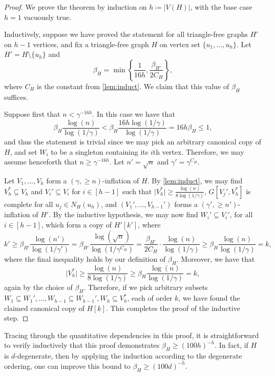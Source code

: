 \documentclass{aic}
\theoremstyle{plain}
\theoremstyle{remark}
\newcommand\ab[1]{\lvert #1 \rvert}
\begin{document}
\begin{proof}
    We prove the theorem by induction on $h\coloneqq\ab{V(H)}$, with the base case $h=1$ vacuously true.

    Inductively, suppose we have proved the statement for all triangle-free graphs $H'$ on $h-1$ vertices, and fix a triangle-free graph $H$ on vertex set $\{u_1,\dots,u_h\}$. Let $H' = H \setminus \{u_h\}$ and
    \[
    \beta_H = \min \left\{ \frac{1}{16h},  \frac{\beta_{H'}}{2C_H}\right\},
    \]
    where $C_H$ is the constant from \cref{lem:induct}.
    We claim that this value of $\beta_H$ suffices. 

    Suppose first that $n < \gamma^{-16h}$. In this case we have that
    \[
    \beta_H \frac{\log(n)}{\log(1/\gamma)} < \beta_H \frac{16h\log(1/\gamma)}{\log (1/\gamma)} =16h\beta_H \leq 1,
    \]
    and thus the statement is trivial since we may pick an arbitrary canonical copy of $H$, and set $W_i$ to be a singleton containing its $i$th vertex. Therefore, we may assume henceforth that $n \geq \gamma^{-16h}$. Let $n' = \sqrt n$ and $\gamma' = \gamma^{C_H}$.
    
    Let $V_1,\dots,V_h$ form a $(\gamma,\geq n)$-inflation of $H$. By \cref{lem:induct}, we may find $V_h^* \subseteq V_h$ and $V_i' \subseteq V_i$ for $i \in [h-1]$ such that $\ab{V_h^*} \geq  \frac{\log(n)}{8\log(1/\gamma)}$, $G[V_j', V_h^*]$ is complete for all $u_j \in N_H(u_h)$, and  $(V_1',\dots,V_{h-1}')$ forms a $(\gamma',\geq n')$-inflation of $H'$. By the inductive hypothesis, we may now find $W_i' \subseteq V_i'$, for all $i \in [h-1]$, which form a copy of $H'[k']$, where
    \[
    k' \geq \beta_{H'} \frac{\log(n')}{\log(1/\gamma')} = \beta_{H'} \frac{\log(\sqrt n)}{\log(1/\gamma^{C_H})} = \frac{\beta_{H'}}{2C_H} \cdot \frac{\log(n)}{\log(1/\gamma)} \geq \beta_H \frac{\log(n)}{\log(1/\gamma)}=k,
    \]
    where the final inequality holds by our definition of $\beta_H$. Moreover, we have that
    \[
    \ab{V_h^*} \geq  \frac{\log(n)}{8\log(1/\gamma)} \geq \beta_H \frac{\log(n)}{\log(1/\gamma)}=k,
    \]
    again by the choice of $\beta_H$. Therefore, if we pick arbitrary subsets $W_1 \subseteq W_1', \dots,W_{h-1} \subseteq W_{h-1}', W_h \subseteq V_h^*$, each of order $k$, we have found the claimed canonical copy of $H[k]$. This completes the proof of the inductive step.
\end{proof}
Tracing through the quantitative dependencies in this proof, it is straightforward to verify inductively that this proof demonstrates $\beta_H \geq (100 h)^{-h}$. In fact, if $H$ is $d$-degenerate, then by applying the induction according to the degenerate ordering, one can improve this bound to $\beta_H \geq (100d)^{-h}$.
\end{document}
